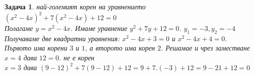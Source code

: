 \documentclass{article}
\newtheorem{problem}{Задача}
\begin{document}
\begin{problem}
	най-големият корен на уравнението $(x^2-4x)^2+ 7(x^2-4x) + 12 =0$  \\
	Полагаме $y = x^2 - 4x $. Имаме уравнение $y^2+7y+12 = 0$. $y_1 = -3, y_2 = -4 $ Получаваме две квадратни уравнения:
	$x^2 - 4x + 3 = 0 $ и $x^2 - 4x + 4 = 0 $. Първото има корени  $3$ и $1$, а второто има корен $2$.
	Решамае и чрез заместване
	$x = 4 $ дава $12 = 0$. не е корен \\
	$x = 3$ дава $(9-12)^2 +7(9-12) + 12 = 9 + 7.(-3) + 12 = 9 - 21 + 12 = 0$
\end{problem}

\end{document}
